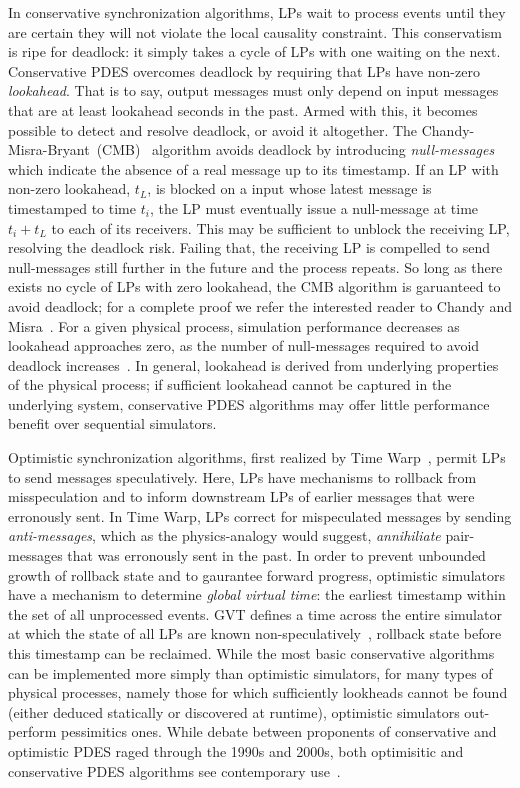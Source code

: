 In conservative synchronization algorithms, LPs wait to process events until
they are certain they will not violate the local causality constraint. This
conservatism is ripe for deadlock: it simply takes a cycle of LPs with one
waiting on the next. Conservative PDES overcomes deadlock by requiring that LPs have non-zero
\emph{lookahead}. That is to say, output messages must only depend on input
messages that are at least lookahead seconds in the past. Armed with this,
it becomes possible to detect and resolve deadlock, or avoid it altogether.
The Chandy-Misra-Bryant~(CMB)~\cite{NullMessagesBryant, NullMessagesChandy} algorithm avoids deadlock by introducing
\emph{null-messages} which indicate the absence of a real
message up to its timestamp. If an LP with non-zero lookahead, $t_{L}$, is blocked on a input whose latest
message is timestamped to time $t_{i}$, the LP must eventually issue a
null-message at time $t_{i} + t_{L}$ to each of its receivers. This may
be sufficient to unblock the receiving LP, resolving the deadlock risk. Failing that, the receiving LP is compelled to
send null-messages still further in the future and the process repeats.
So long as there exists no cycle of LPs with zero lookahead, the CMB algorithm
is garuanteed to avoid deadlock; for a complete proof we refer the interested reader to Chandy and Misra~\cite{NullMessagesChandy}.
For a given physical process, simulation performance decreases as lookahead approaches zero, as the number
of null-messages required to avoid deadlock increases~\cite{PDESFujimotoPrimer}.
In general, lookahead is derived from underlying properties of the
physical process; if sufficient lookahead cannot be
captured in the underlying system, conservative PDES algorithms may offer
little performance benefit over sequential simulators.

Optimistic synchronization algorithms, first realized by Time Warp~\cite{TimeWarp}, permit
LPs to send messages speculatively.  Here, LPs have mechanisms to rollback from
misspeculation and to inform downstream LPs of earlier messages that were
erronously sent. In Time Warp, LPs correct for mispeculated messages by
sending \emph{anti-messages}, which as the physics-analogy would suggest,
\emph{annihiliate} pair-messages that was erronously sent
in the past. In order to prevent unbounded growth of rollback state and to
gaurantee forward progress, optimistic simulators have a mechanism to determine
\emph{global virtual time}: the earliest timestamp within the set of all
unprocessed events. GVT defines a time across the entire simulator at which
the state of all LPs are known non-speculatively~\cite{TimeWarp},
rollback state before this timestamp can be reclaimed. While the most
basic conservative algorithms can be implemented more simply than optimistic
simulators, for many types of physical processes, namely those for which
sufficiently lookheads cannot be found (either deduced statically or discovered
at runtime), optimistic simulators out-perform pessimitics ones. While debate between proponents of conservative and optimistic PDES raged through
the 1990s and 2000s, both optimisitic and conservative PDES algorithms see
contemporary use~\cite{PDESRetrospective}.

